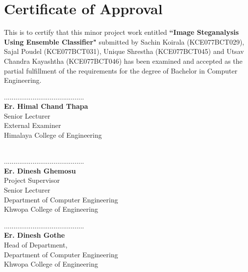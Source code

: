 \titleformat{\chapter}[display]{\normalfont\huge\bfseries\centering}{\chaptertitlename\ \thechapter}{20pt}{\Huge}
\chapter*{ Certificate of Approval}
	\vspace{1cm}
	This is to certify that this minor project work entitled \textbf{``Image Steganalysis Using Ensemble Classifier"} submitted by Sachin Koirala (KCE077BCT029), Sajal Poudel (KCE077BCT031), Unique Shrestha (KCE077BCT045) and Utsav Chandra Kayashtha (KCE077BCT046) has been examined and accepted as the partial fulfillment of the requirements for the degree of Bachelor in Computer Engineering.\\
	\vspace{1in}
	\begin{multicols}{2}
	  \begin{center}
		..........................................\\
		\textbf{Er. Himal Chand Thapa}\\
		Senior Lecturer\\     
		External Examiner\\
		Himalaya College of Engineering\\
		\textbf{}\\
		
	  \end{center}
	
	\columnbreak
	  \begin{center}
		..........................................\\
		\textbf{Er. Dinesh Ghemosu}\\
		Project Supervisor\\
		Senior Lecturer\\
		Department of Computer Engineering\\
		Khwopa College of Engineering\\
		
	  \end{center}
	\end{multicols}
	\vspace{1in}
	\begin{center}
	  ..........................................\\
	  \textbf{Er. Dinesh Gothe}\\
	  Head of Department,\\
	  Department of Computer Engineering\\
	  Khwopa College of Engineering
	\end{center}